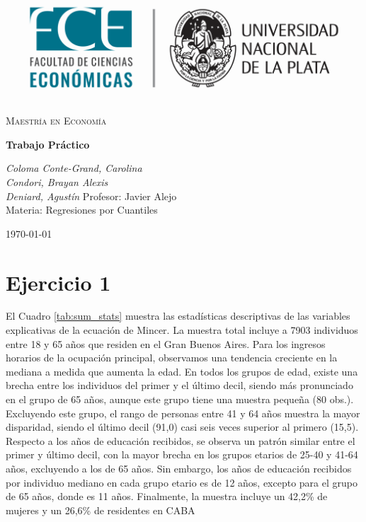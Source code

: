 \documentclass[11pt]{article}
\begin{document}
   


\begin{titlepage}
    \centering
    \vspace*{2cm}
    \includegraphics[width=1\textwidth]{logo.png} 
    
    \vspace{2cm}
    {\scshape\LARGE Maestría en Economía} \\
    
    \vspace{0.5cm}
    {\huge\bfseries
    Trabajo Práctico\par}
    \vspace{2cm}
    {\Large\itshape Coloma Conte-Grand, Carolina} \\
    
    {\Large\itshape Condori, Brayan Alexis} \\
    
    {\Large\itshape Deniard, Agustín}
    \vfill
    {\Large Profesor: Javier Alejo} \\
    \vspace{0.5cm}
    {\Large Materia: Regresiones por Cuantiles}

    \vfill

    {\large \today\par}
\end{titlepage}

\justify 

\section*{Ejercicio 1}


El Cuadro \ref{tab:sum_stats} muestra las estadísticas descriptivas de las variables explicativas de la ecuación de Mincer. La muestra total incluye a 7903 individuos entre 18 y 65 años que residen en el Gran Buenos Aires. Para los ingresos horarios de la ocupación principal, observamos una tendencia creciente en la mediana a medida que aumenta la edad. En todos los grupos de edad, existe una brecha entre los individuos del primer y el último decil, siendo más pronunciado en el grupo de 65 años, aunque este grupo tiene una muestra pequeña (80 obs.). Excluyendo este grupo, el rango de personas entre 41 y 64 años muestra la mayor disparidad, siendo el último decil (91,0) casi seis veces superior al primero (15,5). Respecto a los años de educación recibidos, se observa un patrón similar entre el primer y último decil, con la mayor brecha en los grupos etarios de 25-40 y 41-64 años, excluyendo a los de 65 años. Sin embargo, los años de educación recibidos por individuo mediano en cada grupo etario es de 12 años, excepto para el grupo de 65 años, donde es 11 años. Finalmente, la muestra incluye un 42,2\% de mujeres y un 26,6\% de residentes en CABA
\end{document}
